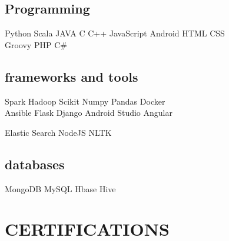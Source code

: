 \documentclass[]{deedy-resume-openfont}
\begin{document}
\begin{minipage}[t]{0.33\textwidth}
\subsection{Programming}
Python \textbullet{} Scala \textbullet{} JAVA \textbullet{} C \textbullet{} C++ \textbullet{} JavaScript \textbullet{} Android \textbullet{} HTML \textbullet{} CSS \\
\vspace{1mm}
Groovy \textbullet{} PHP \textbullet{} C\#
\sectionsep

\subsection{frameworks and tools}

Spark \textbullet{} Hadoop \textbullet{} Scikit \textbullet{} Numpy \textbullet{} Pandas \textbullet{} Docker \\ \textbullet{} Ansible  \textbullet{} Flask \textbullet{} Django \textbullet{} Android Studio \textbullet{} Angular \\

\vspace{1mm}

 \textbullet{} Elastic Search \textbullet{} NodeJS \textbullet{} NLTK

\sectionsep

\subsection{databases}
MongoDB \textbullet{} MySQL \textbullet{} Hbase \textbullet{} Hive \sectionsep


\section{CERTIFICATIONS}

\vspace{1mm}
\vspace{1mm}
\vspace{1mm}
\vspace{1mm}

%
%

\end{minipage}
\end{document}
